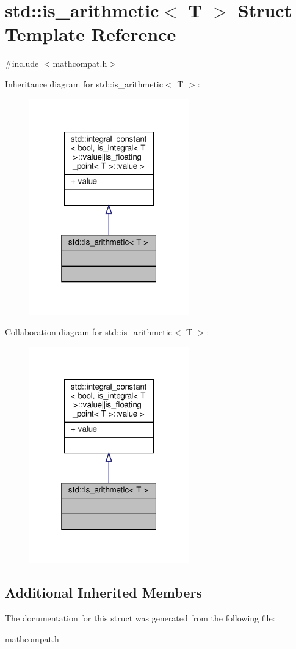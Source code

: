 \hypertarget{structstd_1_1is__arithmetic}{}\section{std\+:\+:is\+\_\+arithmetic$<$ T $>$ Struct Template Reference}
\label{structstd_1_1is__arithmetic}


{\ttfamily \#include $<$mathcompat.\+h$>$}



Inheritance diagram for std\+:\+:is\+\_\+arithmetic$<$ T $>$\+:\nopagebreak
\begin{figure}[H]
\begin{center}
\leavevmode
\includegraphics[width=196pt]{d7/d14/structstd_1_1is__arithmetic__inherit__graph}
\end{center}
\end{figure}


Collaboration diagram for std\+:\+:is\+\_\+arithmetic$<$ T $>$\+:\nopagebreak
\begin{figure}[H]
\begin{center}
\leavevmode
\includegraphics[width=196pt]{d1/dd2/structstd_1_1is__arithmetic__coll__graph}
\end{center}
\end{figure}
\subsection*{Additional Inherited Members}


The documentation for this struct was generated from the following file\+:\begin{DoxyCompactItemize}
\item 
\hyperlink{mathcompat_8h}{mathcompat.\+h}\end{DoxyCompactItemize}
